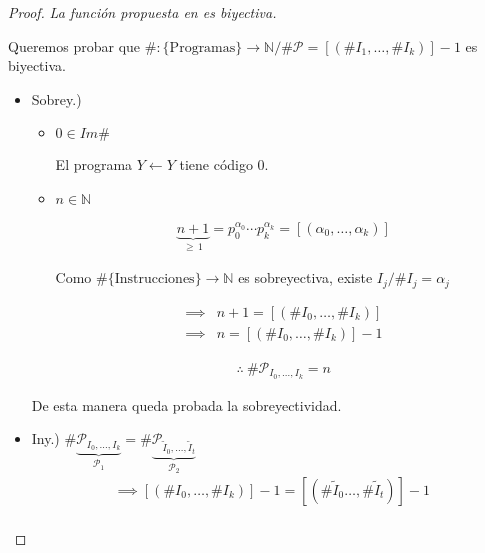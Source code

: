 \begin{proof} \textit{La función propuesta en  
    es biyectiva.}

    Queremos probar que $\#: \{ \text{Programas} \} \to \mathbb{N} / 
        \# \mathcal{P} = [(\#I_1, \dotsc, \#I_k)] - 1$ es biyectiva.

    \begin{itemize}
        \item Sobrey.) 
            \begin{itemize}
                \item $0 \in Im \#$

                    El programa $Y \gets Y$ tiene código 0.

                \item $n \in \mathbb{N}$

                    \begin{gather*}
                        \underbrace{n + 1}_{\geq \, 1} =
                        p_0^{\alpha_0} \cdots p_k^{\alpha_k} =
                        [(\alpha_0, \dotsc, \alpha_k)]
                    \end{gather*}

                    Como $\# \{ \text{Instrucciones} \} \to \mathbb{N}$ es
                    sobreyectiva, existe $I_j / \# I_j = \alpha_j$

                    \begin{align*}
                        \implies& n+1 = [(\# I_0, \dotsc, \#I_k)] \\
                        \implies& n = [(\# I_0, \dotsc, \# I_k)] - 1
                    \end{align*}

                    \begin{gather*}
                        \therefore ~ \# \mathcal{P}_{I_0, \dotsc, I_k} = n
                    \end{gather*}
            \end{itemize}

            De esta manera queda probada la sobreyectividad.

        \item Iny.)
            $\# \underbrace{\mathcal{P}_{I_0, \dotsc, I_k}}_{\mathcal{P}_1} = 
            \# \underbrace{\mathcal{P}_{\widetilde{I}_0, \dotsc, 
            \widetilde{I}_t}}_{\mathcal{P}_2}$
            \begin{gather*}
                    \implies [(\# I_0, \dotsc, \# I_k)] - 1 =
                    [(\# \widetilde{I}_0 \dotsc, \# \widetilde{I}_t)] - 1 \\
            \end{gather*}


\end{itemize}
\end{proof}
